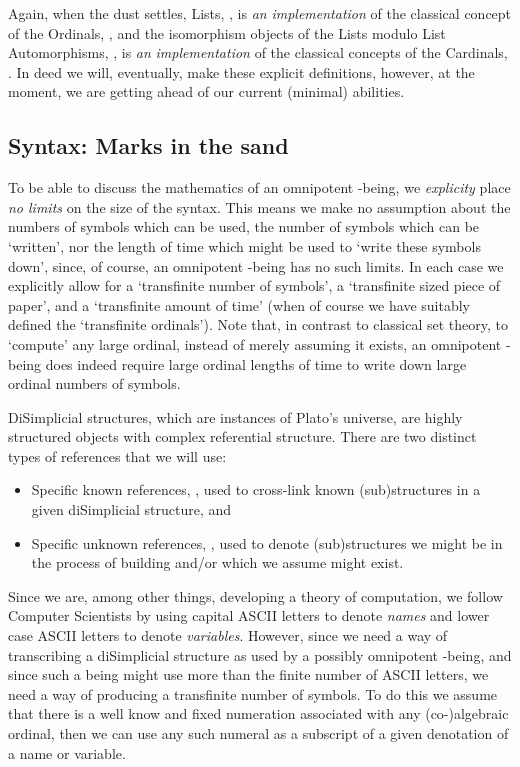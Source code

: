 \documentclass[a4paper,openany]{amsbook}
\begin{document}
Again, when the dust settles, Lists, \Lists, is \emph{an} \emph{implementation}
of the classical concept of the Ordinals, \Ordinal, and the isomorphism objects
of the Lists modulo List Automorphisms, \ListAutomorphisms, is \emph{an}
\emph{implementation} of the classical concepts of the Cardinals, \Cardinal. In
deed we will, eventually, make these explicit definitions, however, at the
moment, we are getting ahead of our current (minimal) abilities.

\subsection{Syntax: Marks in the sand}

To be able to discuss the mathematics of an omnipotent \Cardinal-being, we
\emph{explicity} place \emph{no limits} on the size of the syntax. This means we
make no assumption about the numbers of symbols which can be used, the number of
symbols which can be `written', nor the length of time which might be used to
`write these symbols down', since, of course, an omnipotent \Cardinal-being has
no such limits. In each case we explicitly allow for a `transfinite number of
symbols', a `transfinite sized piece of paper', and a `transfinite amount of
time' (when of course we have suitably defined the `transfinite ordinals'). Note
that, in contrast to classical set theory, to `compute' any large ordinal,
instead of merely assuming it exists, an omnipotent \Cardinal-being does indeed
require large ordinal lengths of time to write down large ordinal numbers of
symbols.

DiSimplicial structures, which are instances of Plato's universe, are highly
structured objects with complex referential structure. There are two
distinct types of references that we will use: 
%
\begin{itemize}
%
\item Specific known references, , used to cross-link known
(sub)structures in a given diSimplicial structure, and 
%
\item Specific unknown references, , used to denote
(sub)structures we might be in the process of building and/or which we assume
might exist. 
%
\end{itemize}
%

Since we are, among other things, developing a theory of computation, we follow
Computer Scientists by using capital ASCII letters to denote \emph{names} and
lower case ASCII letters to denote \emph{variables}. However, since we need a
way of transcribing a diSimplicial structure as used by a possibly omnipotent
\Cardinal-being, and since such a being might use more than the finite number of
ASCII letters, we need a way of producing a transfinite number of symbols. To do
this we assume that there is a well know and fixed numeration associated with
any (co-)algebraic ordinal, then we can use any such numeral as a subscript of a
given denotation of a name or variable.
\end{document}
